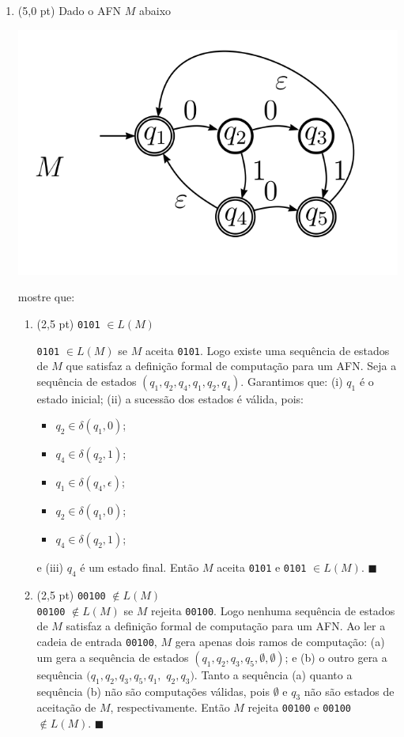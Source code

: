 \documentclass[12pt,a4paper,oneside]{article}
\begin{document}
\begin{enumerate}

	\item (5,0 pt) Dado o AFN $M$ abaixo
	\begin{center}
  		\includegraphics[height=.2\textheight]{imagens/afn.png}
	\end{center}
		
	mostre que:			 
	\begin{enumerate}
		\item (2,5 pt) {\tt 0101} $\in L(M)$ \\
		{\color{verde}
		{\tt 0101} $\in L(M)$ se $M$ aceita {\tt 0101}. Logo existe uma sequência de estados de $M$ que satisfaz a definição formal de computação para um AFN. Seja a sequência de estados $(q_1, q_2, q_4, q_1, q_2, q_4)$. Garantimos que: (i) $q_1$ é o estado inicial; (ii) a sucessão dos estados é válida, pois:
		\begin{itemize}
			\item $q_2 \in \delta(q_1,0)$;
			\item $q_4 \in \delta(q_2,1)$;
			\item $q_1 \in \delta(q_4,\epsilon)$;
			\item $q_2 \in \delta(q_1,0)$;
			\item $q_4 \in \delta(q_2,1)$;
		\end{itemize}
		e (iii) $q_4$ é um estado final. Então $M$ aceita {\tt 0101} e {\tt 0101} $\in L(M)$. $\blacksquare$
		}
		\item (2,5 pt) {\tt 00100} $\not\in L(M)$ \\
		{\color{verde}
		{\tt 00100} $\not\in L(M)$ se $M$ rejeita {\tt 00100}. Logo nenhuma sequência de estados de $M$ satisfaz a definição formal de computação para um AFN. Ao ler a cadeia de entrada {\tt 00100}, $M$ gera apenas dois ramos de computação: (a) um gera a sequência de estados $(q_1, q_2, q_3, q_5, \emptyset, \emptyset)$; e (b) o outro gera a sequência $(q_1, q_2, q_3, q_5, q_1,$ $q_2, q_3)$. Tanto a sequência (a) quanto a sequência (b) não são computações válidas, pois $\emptyset$ e $q_3$ não são estados de aceitação de $M$, respectivamente. Então $M$ rejeita {\tt 00100} e {\tt 00100} $\not\in L(M)$. $\blacksquare$
		}
	\end{enumerate}
	

\end{enumerate}
\end{document}

